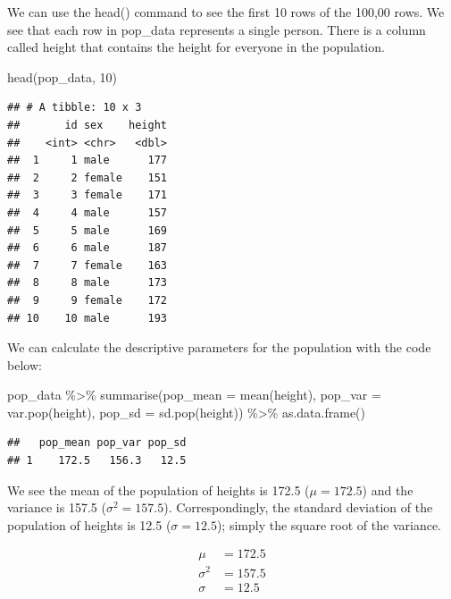 \documentclass[
]{krantz}
\makeatletter
\newenvironment{Shaded}{\begin{snugshade}}{\end{snugshade}}
\newcommand{\AttributeTok}[1]{\textcolor[rgb]{0.61,0.61,0.61}{#1}}
\newcommand{\DecValTok}[1]{\textcolor[rgb]{0.06,0.06,0.06}{#1}}
\newcommand{\FunctionTok}[1]{\textcolor[rgb]{0,0,0}{#1}}
\newcommand{\NormalTok}[1]{#1}
\newcommand{\SpecialCharTok}[1]{\textcolor[rgb]{0,0,0}{#1}}
\newenvironment{kframe}{%
\medskip{}
\setlength{\fboxsep}{.8em}
 \def\at@end@of@kframe{}%
 \ifinner\ifhmode%
  \def\at@end@of@kframe{\end{minipage}}%
  \begin{minipage}{\columnwidth}%
 \fi\fi%
 \def\FrameCommand##1{\hskip\@totalleftmargin \hskip-\fboxsep
 \colorbox{shadecolor}{##1}\hskip-\fboxsep
     \hskip-\linewidth \hskip-\@totalleftmargin \hskip\columnwidth}%
 \MakeFramed {\advance\hsize-\width
   \@totalleftmargin\z@ \linewidth\hsize
   \@setminipage}}%
 {\par\unskip\endMakeFramed%
 \at@end@of@kframe}
\renewenvironment{Shaded}{\begin{kframe}}{\end{kframe}}
\makeatother
\begin{document}
We can use the head() command to see the first 10 rows of the 100,00 rows. We see that each row in pop\_data represents a single person. There is a column called height that contains the height for everyone in the population.

\begin{Shaded}
\begin{Highlighting}[]
\FunctionTok{head}\NormalTok{(pop\_data, }\DecValTok{10}\NormalTok{)}
\end{Highlighting}
\end{Shaded}

\begin{verbatim}
## # A tibble: 10 x 3
##       id sex    height
##    <int> <chr>   <dbl>
##  1     1 male      177
##  2     2 female    151
##  3     3 female    171
##  4     4 male      157
##  5     5 male      169
##  6     6 male      187
##  7     7 female    163
##  8     8 male      173
##  9     9 female    172
## 10    10 male      193
\end{verbatim}

We can calculate the descriptive parameters for the population with the code below:

\begin{Shaded}
\begin{Highlighting}[]
\NormalTok{pop\_data }\SpecialCharTok{\%\textgreater{}\%}
  \FunctionTok{summarise}\NormalTok{(}\AttributeTok{pop\_mean =} \FunctionTok{mean}\NormalTok{(height),}
            \AttributeTok{pop\_var =} \FunctionTok{var.pop}\NormalTok{(height),}
            \AttributeTok{pop\_sd =} \FunctionTok{sd.pop}\NormalTok{(height)) }\SpecialCharTok{\%\textgreater{}\%}
  \FunctionTok{as.data.frame}\NormalTok{()}
\end{Highlighting}
\end{Shaded}

\begin{verbatim}
##   pop_mean pop_var pop_sd
## 1    172.5   156.3   12.5
\end{verbatim}

We see the mean of the population of heights is 172.5 (\(\mu = 172.5\)) and the variance is 157.5 (\(\sigma^2 = 157.5\)). Correspondingly, the standard deviation of the population of heights is 12.5 (\(\sigma = 12.5\)); simply the square root of the variance.

\[
\begin{aligned} 
\mu &= 172.5 \\
\sigma^2 &= 157.5 \\
\sigma &= 12.5 \\
\end{aligned} 
\]
\end{document}
